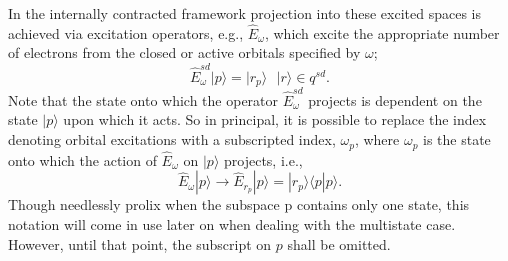 \documentclass[12pt]{article}
\begin{document}
\noindent In the internally contracted framework projection into these excited spaces is achieved via excitation operators, e.g., $\hat{E}_{\omega}$,
which excite the appropriate number of electrons from the closed or active orbitals specified by $\omega$; 
\begin{equation}
\hat{E}^{sd}_{\omega}|p\rangle = |r_{p}\rangle  \text{ \ \ \ \ } |r\rangle \in q^{sd} .
\end{equation}
Note that the state onto which the operator $\hat{E}^{sd}_{\omega}$ projects is dependent on
the state $|p\rangle $  upon which it acts. So in principal, it is possible to replace the index denoting 
orbital excitations with a subscripted index, $\omega_{p}$, where $\omega_{p}$ is the state onto which
the action of $\hat{E}_{\omega}$ on $|p\rangle$ projects, i.e.,
\begin{equation}
\hat{E}_{\omega} |p\rangle \rightarrow 
\hat{E}_{r_{p}} |p\rangle = | r_{p} \rangle \langle p | p \rangle .
\end{equation}
Though needlessly prolix when the subspace $\mathrm{p}$ contains only one state, this notation will
come in use later on when dealing with the multistate case. However, until that point, the subscript on $p$
shall be omitted.\\
\end{document}
